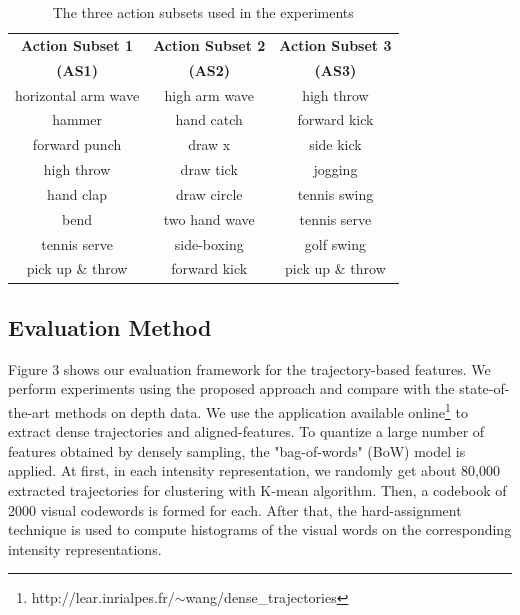 \documentclass[review]{elsarticle}
\begin{document}
\begin{table}[H]
	\begin{center}
		\begin{tabular}{c|c|c}
		
		{\bf Action Subset 1} & {\bf Action Subset 2} & {\bf Action Subset 3} \\
		{\bf(AS1)} & {\bf(AS2)} & {\bf(AS3)} \\
		\hline
		horizontal arm wave &  high arm wave &     high throw \\
		
		        hammer &     hand catch &   forward kick \\
		
		 forward punch &         draw x &      side kick \\
		
		    high throw &      draw tick &        jogging \\
		
		     hand clap &    draw circle &   tennis swing \\
		
		          bend &  two hand wave &   tennis serve \\
		
		  tennis serve &    side-boxing &     golf swing \\
		
		pick up \& throw &   forward kick & pick up \& throw \\
		
		\end{tabular}
	\end{center}
	\caption{\label{lbl:3ActionSubsets}The three action subsets used in the experiments}
\end{table}

\subsection{Evaluation Method}

Figure 3 shows our evaluation framework for the trajectory-based features. We perform experiments using the proposed approach and compare with the state-of-the-art methods on depth data. We use the application available online\footnote{http://lear.inrialpes.fr/$\sim$wang/dense\_trajectories} to extract dense trajectories and aligned-features. To quantize a large number of features obtained by densely sampling, the "bag-of-words" (BoW) model is applied. At first, in each intensity representation, we randomly get about 80,000 extracted trajectories for clustering with K-mean algorithm. Then, a codebook of 2000 visual codewords is formed for each. After that, the hard-assignment technique is used to compute histograms of the visual words on the corresponding intensity representations.
\end{document}
